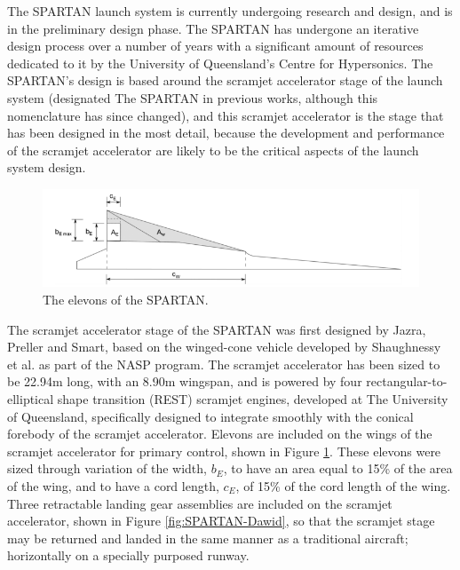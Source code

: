  

 The SPARTAN launch system is currently undergoing research and design, and is in the preliminary design phase. The SPARTAN has undergone an iterative design process over a number of years\cite{Jazra2013,Preller2017b} with a significant amount of resources dedicated to it by the University of Queensland's Centre for Hypersonics.
 The SPARTAN's design is based around the scramjet accelerator stage of the launch system (designated The SPARTAN in previous works, although this nomenclature has since changed), and this scramjet accelerator is the stage that has been designed in the most detail\cite{Jazra2013,Preller2017b}, because the development and performance of the scramjet accelerator are likely to be the critical aspects of the launch system design. 
 
 \begin{figure}[ht]
 	\centering
 	\includegraphics[width=0.8\linewidth]{figures/2_literature-review/SPARTANElevons}
 	\caption{The elevons of the SPARTAN\cite{Preller2017b}.}
 	\label{fig:SPARTANElevons}
 \end{figure}
 
  The scramjet accelerator stage of the SPARTAN was first designed by Jazra, Preller and Smart\cite{Jazra2010, Jazra2013}, based on the winged-cone vehicle developed by Shaughnessy et al. as part of the NASP program\cite{Shaughnessy1990}. 
  The scramjet accelerator has been sized to be 22.94m long, with an 8.90m wingspan, and is powered by four rectangular-to-elliptical shape transition (REST) scramjet engines, developed at The University of Queensland, specifically designed to integrate smoothly with the conical forebody of the scramjet accelerator. Elevons are included on the wings of the scramjet accelerator for primary control, shown in Figure \ref{fig:SPARTANElevons}. These elevons were sized through variation of the width, $b_E$, to have an area equal to 15\% of the area of the wing, and to have a cord length, $c_E$, of 15\% of the cord length of the wing\cite{Preller2018a}.
  Three retractable landing gear assemblies are included on the scramjet accelerator, shown in Figure \ref{fig:SPARTAN-Dawid}, so that the scramjet stage may be returned and landed in the same manner as a traditional aircraft; horizontally on a specially purposed runway. 
  
